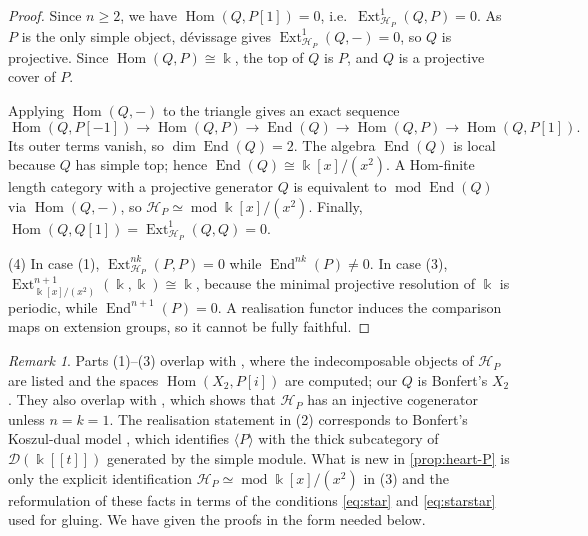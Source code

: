\documentclass[11pt,reqno]{amsart}
\theoremstyle{plain}
\theoremstyle{definition}
\theoremstyle{remark}
\newtheorem{remark}[theorem]{Remark}
\newcommand{\kk}{\Bbbk}
\DeclareMathOperator{\Hom}{Hom}
\DeclareMathOperator{\End}{End}
\DeclareMathOperator{\Ext}{Ext}
\newcommand{\modd}{\operatorname{mod}}
\newcommand{\thick}[1]{\langle #1\rangle}
\newcommand{\cH}{\mathcal{H}}
\begin{document}
\begin{proof}
Since $n\ge2$, we have $\Hom(Q,P[1])=0$, i.e.\ $\Ext^1_{\cH_P}(Q,P)=0$. As $P$ is the only simple object, d\'evissage gives $\Ext^1_{\cH_P}(Q,-)=0$, so $Q$ is projective. Since $\Hom(Q,P)\cong\kk$, the top of $Q$ is $P$, and $Q$ is a projective cover of $P$.

Applying $\Hom(Q,-)$ to the triangle gives an exact sequence
\[\Hom(Q,P[-1])\to\Hom(Q,P)\to\End(Q)\to\Hom(Q,P)\to\Hom(Q,P[1]).\]
Its outer terms vanish, so $\dim\End(Q)=2$. The algebra $\End(Q)$ is local because $Q$ has simple top; hence $\End(Q)\cong\kk[x]/(x^2)$. A Hom-finite length category with a projective generator $Q$ is equivalent to $\modd\End(Q)$ via $\Hom(Q,-)$, so $\cH_P\simeq\modd\kk[x]/(x^2)$. Finally, $\Hom(Q,Q[1])=\Ext^1_{\cH_P}(Q,Q)=0$.

(4) In case (1), $\Ext^{nk}_{\cH_P}(P,P)=0$ while $\End^{nk}(P)\ne0$. In case (3), $\Ext^{n+1}_{\kk[x]/(x^2)}(\kk,\kk)\cong\kk$, because the minimal projective resolution of $\kk$ is periodic, while $\End^{n+1}(P)=0$. A realisation functor induces the comparison maps on extension groups, so it cannot be fully faithful.
\end{proof}

\begin{remark}
Parts (1)--(3) overlap with \cite[Lemma~3.11]{Bonf26}, where the indecomposable objects of $\cH_P$ are listed and the spaces $\Hom(X_2,P[i])$ are computed; our $Q$ is Bonfert's $X_2$. They also overlap with \cite[Lemma~4.15]{Bonf26}, which shows that $\cH_P$ has an injective cogenerator unless $n=k=1$. The realisation statement in (2) corresponds to Bonfert's Koszul-dual model \cite[Cor.~4.16(2)]{Bonf26}, which identifies $\thick P$ with the thick subcategory of $\mathcal{D}(\kk[[t]])$ generated by the simple module. What is new in \cref{prop:heart-P} is only the explicit identification $\cH_P\simeq\modd\kk[x]/(x^2)$ in (3) and the reformulation of these facts in terms of the conditions \eqref{eq:star} and \eqref{eq:starstar} used for gluing. We have given the proofs in the form needed below.
\end{remark}
\end{document}
